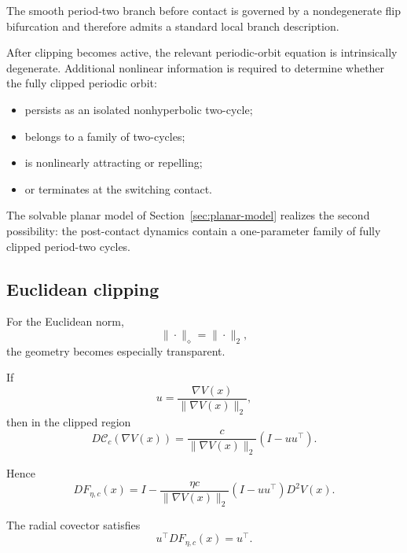 \begin{remark}
\label{rem:no-universal-postcontact-theorem}
The smooth period-two branch before contact is governed by a
nondegenerate flip bifurcation and therefore admits a standard local
branch description.

After clipping becomes active, the relevant periodic-orbit equation
is intrinsically degenerate.  Additional nonlinear information is
required to determine whether the fully clipped periodic orbit:

\begin{itemize}
\item persists as an isolated nonhyperbolic two-cycle;
\item belongs to a family of two-cycles;
\item is nonlinearly attracting or repelling;
\item or terminates at the switching contact.
\end{itemize}

The solvable planar model of Section~\ref{sec:planar-model} realizes
the second possibility: the post-contact dynamics contain a
one-parameter family of fully clipped period-two cycles.
\end{remark}

\subsection{Euclidean clipping}
\label{subsec:euclidean-postcontact-main}

For the Euclidean norm,
\[
\|\cdot\|_\diamond
=
\|\cdot\|_2,
\]
the geometry becomes especially transparent.

If
\[
u
=
\frac{\nabla V(x)}
{\|\nabla V(x)\|_2},
\]
then in the clipped region
\begin{equation}
D\mathcal C_c(\nabla V(x))
=
\frac{c}{\|\nabla V(x)\|_2}
\left(
I-uu^\top
\right).
\label{eq:euclidean-clipping-Jacobian-main}
\end{equation}

Hence
\begin{equation}
DF_{\eta,c}(x)
=
I
-
\frac{\eta c}{
\|\nabla V(x)\|_2
}
\left(
I-uu^\top
\right)
D^2V(x).
\label{eq:euclidean-clipped-map-Jacobian}
\end{equation}

The radial covector satisfies
\begin{equation}
u^\top DF_{\eta,c}(x)
=
u^\top.
\label{eq:euclidean-radial-left-eigenvector}
\end{equation}

